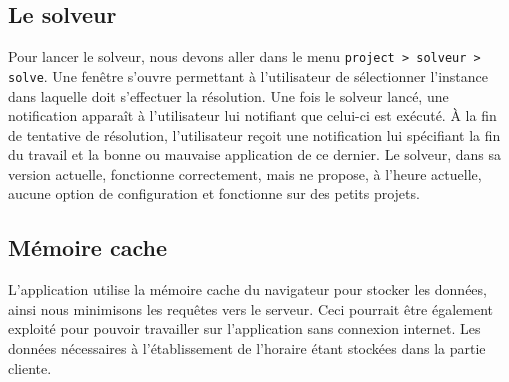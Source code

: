 \subsection{Le solveur}
Pour lancer le solveur, nous devons aller dans le menu \texttt{project > solveur > solve}. Une fenêtre s'ouvre permettant à l'utilisateur de sélectionner l'instance dans laquelle doit s'effectuer la résolution. Une fois le solveur lancé, une notification apparaît à l'utilisateur lui notifiant que celui-ci est exécuté. À la fin de tentative de résolution, l'utilisateur reçoit une notification lui spécifiant la fin du travail et la bonne ou mauvaise application de ce dernier. Le solveur, dans sa version actuelle, fonctionne correctement, mais ne propose, à l'heure actuelle, aucune option de configuration et fonctionne sur des petits projets. 


\subsection{Mémoire cache}
L'application utilise la mémoire cache du navigateur pour stocker les données, ainsi nous minimisons les requêtes vers le serveur. Ceci pourrait être également exploité pour pouvoir travailler sur l'application sans connexion internet. Les données nécessaires à l'établissement de l'horaire étant stockées dans la partie cliente.



















